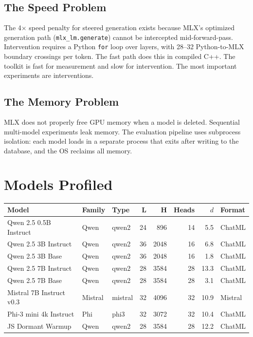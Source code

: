 \documentclass[11pt,a4paper]{article}
\begin{document}
\subsection{The Speed Problem}

The 4$\times$ speed penalty for steered generation exists because MLX's optimized generation path (\texttt{mlx\_lm.generate}) cannot be intercepted mid-forward-pass. Intervention requires a Python \texttt{for} loop over layers, with 28--32 Python-to-MLX boundary crossings per token. The fast path does this in compiled C++. The toolkit is fast for measurement and slow for intervention. The most important experiments are interventions.

\subsection{The Memory Problem}

MLX does not properly free GPU memory when a model is deleted. Sequential multi-model experiments leak memory. The evaluation pipeline uses subprocess isolation: each model loads in a separate process that exits after writing to the database, and the OS reclaims all memory.

\section{Models Profiled}

\begin{center}
\begin{longtable}{lllrrrrl}
\toprule
\textbf{Model} & \textbf{Family} & \textbf{Type} & \textbf{L} & \textbf{H} & \textbf{Heads} & \textbf{$d$} & \textbf{Format} \\
\midrule
\endhead
Qwen 2.5 0.5B Instruct & Qwen & qwen2 & 24 & 896 & 14 & 5.5 & ChatML \\
Qwen 2.5 3B Instruct & Qwen & qwen2 & 36 & 2048 & 16 & 6.8 & ChatML \\
Qwen 2.5 3B Base & Qwen & qwen2 & 36 & 2048 & 16 & 1.8 & ChatML \\
Qwen 2.5 7B Instruct & Qwen & qwen2 & 28 & 3584 & 28 & 13.3 & ChatML \\
Qwen 2.5 7B Base & Qwen & qwen2 & 28 & 3584 & 28 & 3.1 & ChatML \\
Mistral 7B Instruct v0.3 & Mistral & mistral & 32 & 4096 & 32 & 10.9 & Mistral \\
Phi-3 mini 4k Instruct & Phi & phi3 & 32 & 3072 & 32 & 10.4 & ChatML \\
JS Dormant Warmup & Qwen & qwen2 & 28 & 3584 & 28 & 12.2 & ChatML \\
\bottomrule
\end{longtable}
\end{center}
\end{document}
